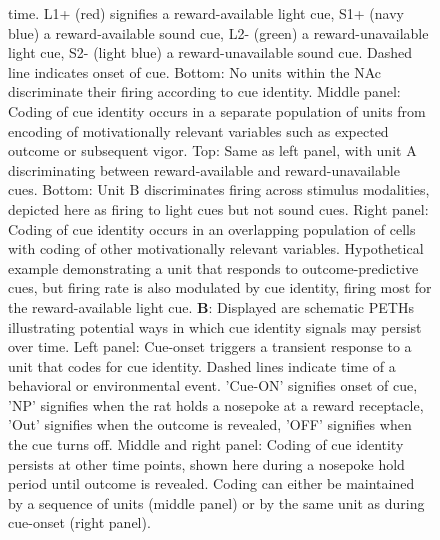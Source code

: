\documentclass[11pt]{article}
\newcommand{\bsf}[1]{\textbf{#1}}
\begin{document}
\begin{figure}[ht!]
{  time. L1+ (red) signifies a reward-available light cue, S1+ (navy
  blue) a reward-available sound cue, L2- (green) a reward-unavailable
  light cue, S2- (light blue) a reward-unavailable sound cue. Dashed
  line indicates onset of cue. Bottom: No units within the NAc
  discriminate their firing according to cue identity. Middle panel:
  Coding of cue identity occurs in a separate population of units from
  encoding of motivationally relevant variables such as expected
  outcome or subsequent vigor. Top: Same as left panel, with unit A
  discriminating between reward-available and reward-unavailable
  cues. Bottom: Unit B discriminates firing across stimulus
  modalities, depicted here as firing to light cues but not sound
  cues. Right panel: Coding of cue identity occurs in an overlapping
  population of cells with coding of other motivationally relevant
  variables. Hypothetical example demonstrating a unit that responds
  to outcome-predictive cues, but firing rate is also modulated by cue
  identity, firing most for the reward-available light cue. \bsf{B}:
  Displayed are schematic PETHs illustrating potential ways in which
  cue identity signals may persist over time. Left panel: Cue-onset
  triggers a transient response to a unit that codes for cue
  identity. Dashed lines indicate time of a behavioral or
  environmental event. 'Cue-ON' signifies onset of cue, 'NP' signifies
  when the rat holds a nosepoke at a reward receptacle, 'Out'
  signifies when the outcome is revealed, 'OFF' signifies when the cue
  turns off. Middle and right panel: Coding of cue identity persists
  at other time points, shown here during a nosepoke hold period until
  outcome is revealed. Coding can either be maintained by a sequence
  of units (middle panel) or by the same unit as during cue-onset
  (right panel).}
\label{fig:schematic}
\end{figure} \clearpage
\end{document}
